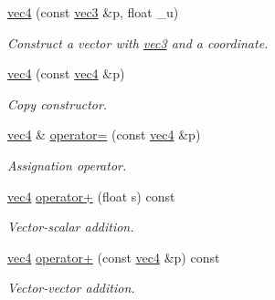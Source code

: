 \begin{DoxyCompactItemize}
\hyperlink{structphysim_1_1math_1_1vec4_a23ecd33ac90b6f1200643da762bfbb7c}{vec4} (const \hyperlink{structphysim_1_1math_1_1vec3}{vec3} \&p, float \+\_\+u)
\begin{DoxyCompactList}\small\item\em Construct a vector with \hyperlink{structphysim_1_1math_1_1vec3}{vec3} and a coordinate. \end{DoxyCompactList}\item 
\mbox{\label{structphysim_1_1math_1_1vec4_a992a98b98f1b98f4b2c5dcb7a5c9dc2e}} 
\hyperlink{structphysim_1_1math_1_1vec4_a992a98b98f1b98f4b2c5dcb7a5c9dc2e}{vec4} (const \hyperlink{structphysim_1_1math_1_1vec4}{vec4} \&p)
\begin{DoxyCompactList}\small\item\em Copy constructor. \end{DoxyCompactList}\item 
\mbox{\label{structphysim_1_1math_1_1vec4_ac84f74b2b80605321cd2226512bb72d8}} 
\hyperlink{structphysim_1_1math_1_1vec4}{vec4} \& \hyperlink{structphysim_1_1math_1_1vec4_ac84f74b2b80605321cd2226512bb72d8}{operator=} (const \hyperlink{structphysim_1_1math_1_1vec4}{vec4} \&p)
\begin{DoxyCompactList}\small\item\em Assignation operator. \end{DoxyCompactList}\item 
\mbox{\label{structphysim_1_1math_1_1vec4_a35a34cfef7aa8a77cf7948c973089ad4}} 
\hyperlink{structphysim_1_1math_1_1vec4}{vec4} \hyperlink{structphysim_1_1math_1_1vec4_a35a34cfef7aa8a77cf7948c973089ad4}{operator+} (float s) const
\begin{DoxyCompactList}\small\item\em Vector-\/scalar addition. \end{DoxyCompactList}\item 
\mbox{\label{structphysim_1_1math_1_1vec4_a3a9516c431f9ef1ac1f0bdbd10e300f3}} 
\hyperlink{structphysim_1_1math_1_1vec4}{vec4} \hyperlink{structphysim_1_1math_1_1vec4_a3a9516c431f9ef1ac1f0bdbd10e300f3}{operator+} (const \hyperlink{structphysim_1_1math_1_1vec4}{vec4} \&p) const
\begin{DoxyCompactList}\small\item\em Vector-\/vector addition. \end{DoxyCompactList}\item 

\end{DoxyCompactItemize}
